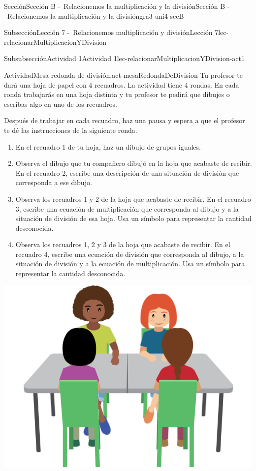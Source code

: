 \documentclass[twoside,10pt,]{article}
\begin{document}
\begin{sectionptx}{Sección}{Sección B -~Relacionemos la multiplicación y la división}{}{Sección B -~Relacionemos la multiplicación y la división}{}{}{gra3-uni4-secB}
\begin{subsectionptx}{Subsección}{Lección 7 -~Relacionemos multiplicación y división}{}{Lección 7}{}{}{lec-relacionarMultiplicacionYDivision}
%
%
\typeout{************************************************}
\typeout{************************************************}
%
\begin{subsubsectionptx}{Subsubsección}{Actividad 1}{}{Actividad 1}{}{}{lec-relacionarMultiplicacionYDivision-act1}
\begin{activity}{Actividad}{Mesa redonda de división.}{act-mesaRedondaDeDivision}%
Tu profesor te dará una hoja de papel con 4 recuadros. La actividad tiene 4 rondas. En cada ronda trabajarás en una hoja distinta y tu profesor te pedirá que dibujes o escribas algo en uno de los recuadros.%
\par
Después de trabajar en cada recuadro, haz una pausa y espera a que el profesor te dé las instrucciones de la siguiente ronda.%
%
\begin{enumerate}
\item{}En el recuadro 1 de tu hoja, haz un dibujo de grupos iguales.%
\item{}Observa el dibujo que tu compañero dibujó en la hoja que acabaste de recibir. En el recuadro 2, escribe una descripción de una situación de división que corresponda a ese dibujo.%
\item{}Observa los recuadros 1 y 2 de la hoja que acabaste de recibir. En el recuadro 3, escribe una ecuación de multiplicación que corresponda al dibujo y a la situación de división de esa hoja. Usa un símbolo para representar la cantidad desconocida.%
\item{}Observa los recuadros 1, 2 y 3 de la hoja que acabaste de recibir. En el recuadro 4, escribe una ecuación de división que corresponda al dibujo, a la situación de división y a la ecuación de multiplicación. Usa un símbolo para representar la cantidad desconocida.%
\end{enumerate}
\begin{image}{0.2}{0.6}{0.2}{}%
\includegraphics[width=\linewidth]{external/png-source/CS 3.4 Lesson 7 Activity 1.png}

\end{image}
\end{activity}
\end{subsubsectionptx}
\end{subsectionptx}
\end{sectionptx}
\end{document}
